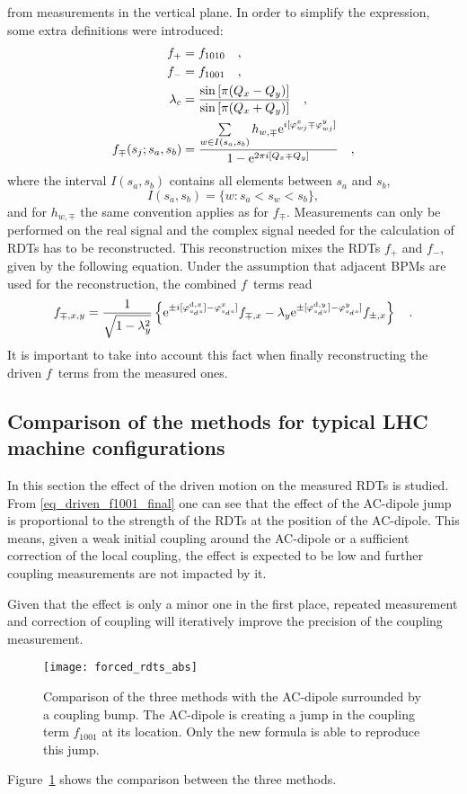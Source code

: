 %
from measurements in the vertical plane.
In order to simplify the expression, some extra definitions were introduced:
%
\begin{align}
    f_+ &= f_{1010}\quad ,\notag \\
    f_- &= f_{1001}\quad ,\notag \\
    \lambda_c &= \frac{\sin\left[\pi(Q_x-Q_y)\right]}{\sin\left[\pi(Q_x+Q_y)\right]}\quad ,
    \notag \\
    f_{\mp}(s_j;s_a,s_b) &= \frac{
        \sum\limits_{w\in I(s_a,s_b)} h_{w,\mp}\text{e}^{i[\varphi_{wj}^x \mp \varphi_{wj}^y]}
    }{
        1-\text{e}^{2\pi i [Q_x\mp Q_y]}
    }\quad ,
\end{align}
%
where the interval $I(s_a,s_b)$  contains all elements between $s_a$ and $s_b$,
%
\begin{equation}
    I(s_a,s_b) = \{w: s_a < s_w < s_b\},
\end{equation}
%
and for $h_{w,\mp}$ the same convention applies as for $f_\mp$.
Measurements can only be performed on the real signal and the complex signal needed for the calculation
of RDTs has to be reconstructed.  
This reconstruction mixes the RDTs $f_+$ and $f_-$, given by the following equation. Under the assumption
that adjacent BPMs are used for the reconstruction, the combined $f$~terms read
%
\begin{align}
   f_{\mp,x,y} = \frac{1}{\sqrt{1-\lambda_y^2}}
   \left\{
       \text{e}^{\pm i [\varphi^{\text{d},x}_{s_ds}] - \varphi^{x}_{s_ds}]}f_{\mp,x}
       - \lambda_y\text{e}^{\pm[\varphi^{\text{d},y}_{s_ds}] - \varphi^{y}_{s_ds}]}f_{\pm,x}
    \right\}
    \quad .
\end{align}
%
It is important to take into account this fact when finally reconstructing the driven $f$~terms from
the measured ones.

\subsection{Comparison of the methods for typical LHC machine configurations}

In this section the effect of the driven motion on the measured RDTs is studied. From \eqref{eq_driven_f1001_final}
one can see that the effect of the AC-dipole jump is proportional to the strength of the RDTs at the 
position of the AC-dipole. This means, given a weak initial coupling around the AC-dipole or a sufficient
correction of the local coupling, the effect is expected to be low and further coupling measurements
are not impacted by it. 

Given that the effect is only a minor one in the first place, repeated measurement and correction of
coupling will iteratively improve the precision of the coupling measurement.
%
\begin{figure}[h]
  \centering
  \texttt{[image: forced\_rdts\_abs]}
  \caption{Comparison of the three methods with the AC-dipole surrounded by a coupling bump.
    The AC-dipole is creating a jump in the coupling term $f_{1001}$ at its location. Only the new
    formula is able to reproduce this jump.
  }
  \label{fig_comp_felix_ryo}
\end{figure}
%

Figure~\ref{fig_comp_felix_ryo} shows the comparison between the three methods.